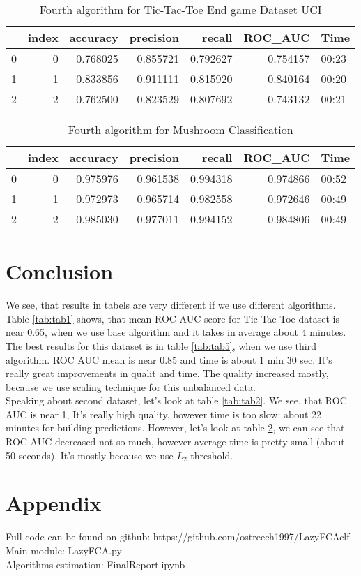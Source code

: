 \documentclass[12t]{article}
\begin{document}
\begin{table}[H]
\begin{tabular}{lrrrrrl}
	\toprule
	{} &  index &  accuracy &  precision &    recall &   ROC\_AUC &   Time \\
	\midrule
	0 &      0 &  0.768025 &   0.855721 &  0.792627 &  0.754157 &  00:23 \\
	1 &      1 &  0.833856 &   0.911111 &  0.815920 &  0.840164 &  00:20 \\
	2 &      2 &  0.762500 &   0.823529 &  0.807692 &  0.743132 &  00:21 \\
	\bottomrule
\end{tabular}
	\caption{Fourth algorithm for Tic-Tac-Toe End game Dataset UCI  \label{tab:tab7}}
\end{table}

\begin{table}[H]
\begin{tabular}{lrrrrrl}
	\toprule
	{} &  index &  accuracy &  precision &    recall &   ROC\_AUC &   Time \\
	\midrule
	0 &      0 &  0.975976 &   0.961538 &  0.994318 &  0.974866 &  00:52 \\
	1 &      1 &  0.972973 &   0.965714 &  0.982558 &  0.972646 &  00:49 \\
	2 &      2 &  0.985030 &   0.977011 &  0.994152 &  0.984806 &  00:49 \\
	\bottomrule
\end{tabular}
	\caption{Fourth algorithm for Mushroom Classification	  \label{tab:tab8}}
\end{table}

\section{Conclusion}
We see, that results in tabels are very different if we use different algorithms. Table \ref{tab:tab1} shows, that mean ROC AUC score for Tic-Tac-Toe dataset is near 0.65, when we use base algorithm and it takes in average about 4 minutes. The best results for this dataset is in table \ref{tab:tab5}, when we use third algorithm. ROC AUC mean is near 0.85 and time is about 1 min 30 sec. It's really great improvements in qualit and time. The quality increased mostly, because we use scaling technique for this unbalanced data. \\
Speaking about second dataset, let's look at table \ref{tab:tab2}. We see, that ROC AUC is near 1, It's really high quality, however time is too slow: about 22 minutes for building predictions. However, let's look at table \ref{tab:tab8}, we can see that ROC AUC decreased not so much, however average time is pretty small (about 50 seconds). It's mostly because we use $L_2$ threshold.

\newpage

\section{Appendix}
Full code can be found on github: https://github.com/ostreech1997/LazyFCAclf \\
Main module: LazyFCA.py \\
Algorithms estimation: FinalReport.ipynb
\end{document}
